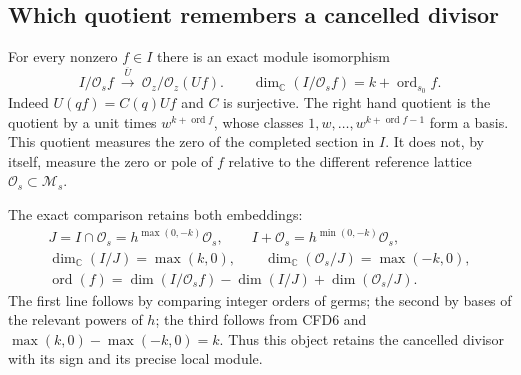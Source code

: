 \documentclass[11pt]{article}
\theoremstyle{definition}
\begin{document}
\subsection{Which quotient remembers a cancelled divisor}

For every nonzero $f\in I$ there is an exact module isomorphism
\begin{equation}\tag{CFD6}
 I/\mathcal O_s f\ \xrightarrow{\ \overline U\ }\
 \mathcal O_z/\mathcal O_z(Uf).
 \qquad
 \dim_{\mathbb C}(I/\mathcal O_s f)
       =k+\operatorname{ord}_{s_0}f.
\end{equation}
Indeed $U(qf)=C(q)Uf$ and $C$ is surjective. The right hand quotient
is the quotient by a unit times $w^{k+\operatorname{ord}f}$, whose
classes $1,w,\ldots,w^{k+\operatorname{ord}f-1}$ form a basis.
This quotient measures the zero of the completed section in $I$.
It does not, by itself, measure the zero or pole of $f$ relative to
the different reference lattice $\mathcal O_s\subset\mathcal M_s$.

The exact comparison retains both embeddings:
\begin{equation}\tag{CFD7}
\begin{gathered}
 J=I\cap\mathcal O_s=h^{\max(0,-k)}\mathcal O_s,\qquad
 I+\mathcal O_s=h^{\min(0,-k)}\mathcal O_s,\\
 \dim_{\mathbb C}(I/J)=\max(k,0),\qquad
 \dim_{\mathbb C}(\mathcal O_s/J)=\max(-k,0),\\
 \operatorname{ord}(f)
 =\dim(I/\mathcal O_s f)-\dim(I/J)+\dim(\mathcal O_s/J).
\end{gathered}
\end{equation}
The first line follows by comparing integer orders of germs; the
second by bases of the relevant powers of $h$; the third follows
from CFD6 and $\max(k,0)-\max(-k,0)=k$. Thus this object retains
the cancelled divisor with its sign and its precise local module.
\end{document}
